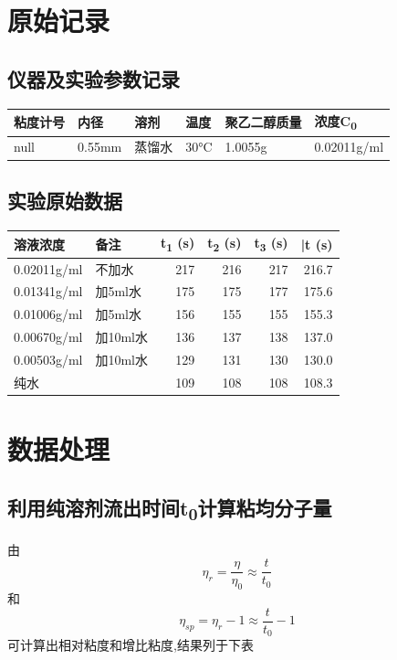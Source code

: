 \documentclass[11pt]{report}
\begin{document}
\chapter{原始记录}
\label{sec:org9e2bb20}
\section{仪器及实验参数记录}
\label{sec:org3d328d2}
\begin{center}
\begin{tabular}{llllll}
粘度计号 & 内径 & 溶剂 & 温度 & 聚乙二醇质量 & 浓度C\textsubscript{0}\\
\hline
null & 0.55mm & 蒸馏水 & 30°C & 1.0055g & 0.02011g/ml\\
\end{tabular}
\end{center}

\section{实验原始数据}
\label{sec:orga95d0dc}

\begin{center}
\begin{tabular}{llrrrr}
溶液浓度 & 备注 & t\textsubscript{1} (s) & t\textsubscript{2} (s) & t\textsubscript{3} (s) & \bar{t} (s)\\
\hline
0.02011g/ml & 不加水 & 217 & 216 & 217 & 216.7\\
0.01341g/ml & 加5ml水 & 175 & 175 & 177 & 175.6\\
0.01006g/ml & 加5ml水 & 156 & 155 & 155 & 155.3\\
0.00670g/ml & 加10ml水 & 136 & 137 & 138 & 137.0\\
0.00503g/ml & 加10ml水 & 129 & 131 & 130 & 130.0\\
纯水 &  & 109 & 108 & 108 & 108.3\\
\end{tabular}
\end{center}

\chapter{数据处理}
\label{sec:orgfa1935c}
\section{利用纯溶剂流出时间t\textsubscript{0}计算粘均分子量}
\label{sec:org7793705}
由
\[
\eta_{r}=\frac{\eta}{\eta_{0}}\approx \frac{t}{t_{0}}
\]
和
\[
\eta_{sp}=\eta_{r}-1\approx \frac{t}{t_{0}}-1
\]
可计算出相对粘度和增比粘度,结果列于下表
\end{document}
